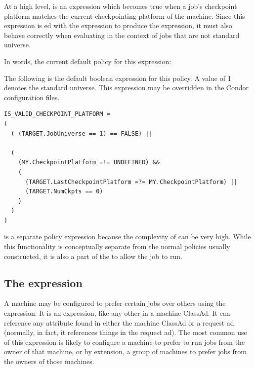 At a high level,  is an expression
which becomes true when a job's checkpoint platform matches the
current checkpointing platform of the machine. 
Since this expression is ed with the  expression
to produce the  expression,
it must also behave correctly when evaluating in the context of jobs
that are not standard universe.

In words,
the current default policy for this expression:


The following  is the default boolean expression for this
policy.
A  value of 1 denotes the standard universe.
This expression  may be
overridden in the Condor configuration files.

\footnotesize
\begin{verbatim}
IS_VALID_CHECKPOINT_PLATFORM = 
(
  ( (TARGET.JobUniverse == 1) == FALSE) ||

  (
    (MY.CheckpointPlatform =!= UNDEFINED) &&
    (
      (TARGET.LastCheckpointPlatform =?= MY.CheckpointPlatform) ||
      (TARGET.NumCkpts == 0)
    )
  )
)
\end{verbatim}
\normalsize

is a separate policy expression because the complexity of
 can be very high.
While this
functionality is conceptually separate from the normal 
policies usually constructed, it is also a part of the 
to allow the job to run.

\subsection{\label{sec:Rank-Expression}
The  expression}

A machine may be configured to prefer certain jobs over others
using the  expression.
It is an
expression, like any other in a machine ClassAd.
It can
reference any attribute found in either the machine ClassAd or a
request ad (normally, in fact, it references things in the request
ad).
The most common use of this expression is likely to configure a
machine to prefer to run jobs from the owner of that machine, or by
extension, a group of machines to prefer jobs from the owners of those
machines.

